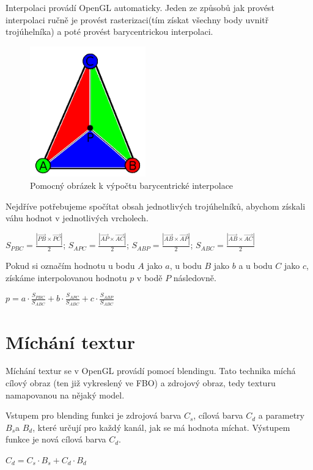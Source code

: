 \documentclass[11pt,twoside,a4paper]{book}
\begin{document}
Interpolaci provádí OpenGL automaticky. Jeden ze způsobů jak provést interpolaci ručně je provést rasterizaci(tím získat všechny body uvnitř trojúhelníka) a poté provést barycentrickou interpolaci.

\begin{center}
\begin{figure}[h]
\includegraphics[width=50mm]{figures/interpolation.png}
\caption{Pomocný obrázek k výpočtu barycentrické interpolace}
\end{figure}
\end{center}

Nejdříve potřebujeme spočítat obsah jednotlivých trojúhelníků, abychom získali váhu hodnot v jednotlivých vrcholech.
\begin{center} 
$S_{PBC} = \frac{|\vec{PB} \times \vec{PC}|}{2}$;
$S_{APC} = \frac{|\vec{AP} \times \vec{AC}|}{2}$; 
$S_{ABP} = \frac{|\vec{AB} \times \vec{AP}|}{2}$;
$S_{ABC} = \frac{|\vec{AB} \times \vec{AC}|}{2}$
\end{center}

Pokud si označím hodnotu u bodu $A$ jako $a$, u bodu $B$ jako $b$ a u bodu $C$ jako $c$, získáme interpolovanou hodnotu $p$ v bodě $P$ následovně.
\begin{center}
$p = a \cdot \frac{S_{PBC}}{S_{ABC}} + b \cdot \frac{S_{APC}}{S_{ABC}} + c \cdot \frac{S_{ABP}}{S_{ABC}}$
\end{center}

\section{Míchání textur}

Míchání textur se v OpenGL provádí pomocí blendingu. Tato technika míchá cílový obraz (ten již vykreslený ve FBO) a zdrojový obraz, tedy texturu namapovanou na nějaký model.

Vstupem pro blending funkci je zdrojová barva $C_s$, cílová barva $C_d$ a parametry $B_s$\linebreak a $B_d$, které určují pro každý kanál, jak se má hodnota míchat. Výstupem funkce je nová cílová barva $C_d$.
\begin{center}
$C_d = C_s \cdot B_s + C_d \cdot B_d$
\end{center}
\end{document}
